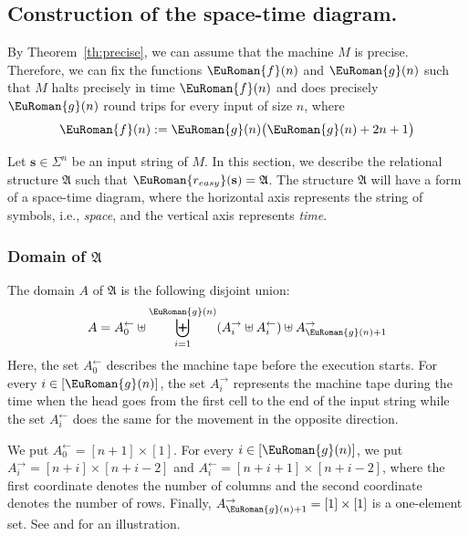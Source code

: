 \documentclass[10pt,a4paper]{amsart}
\theoremstyle{plain}
\theoremstyle{definition}
\numberwithin{equation}{section}
\newcommand{\eurm}[1]{\EuRoman{#1}} %
\newcommand{\ie}{i.e.\xspace}  %
\newcommand{\structure}[1]{\mathfrak{#1}} %
\newcommand{\tuple}[1]{\mathbf{#1}} %
\newcommand{\func}[1]{\eurm{#1}}  %
\begin{document}
\medskip




\subsection{Construction of the space-time diagram.}\label{subsection:space_time_diagram}

By Theorem~\ref{th:precise}, we can assume that the machine $M$ is precise. Therefore, we can fix the functions $\func{f}(n)$ and $\func{g}(n)$ such that $M$ halts precisely in time $\func{f}(n)$ and does precisely $\func{g}(n)$ round trips for every input of size $n$, where
\begin{equation*}
\func{f}(n) := \func{g}(n)\bigl(\func{g}(n)+2n+1\bigr)
\end{equation*} 


Let $\tuple{s}\in\Sigma^n$ be an input string of $M$. In this section, we describe the relational structure $\structure{A}$ such that $\func{r_{easy}}(\tuple{s}) = \structure{A}$. 
The structure $\structure{A}$ will have a form of a space-time diagram, where the horizontal axis represents the string of symbols, \ie, \emph{space}, and the vertical axis represents \emph{time}.

\subsubsection*{Domain of $\structure{A}$}
The domain $A$ of $\structure{A}$ is the following disjoint union:
\begin{equation}
A = A_0^\leftarrow\uplus \biguplus_{i=1}^{\func{g}(n)}(A_i^\rightarrow\uplus A_i^\leftarrow) \uplus A_{\func{g}(n)+1}^\rightarrow
\end{equation}
Here, the set $A_0^\leftarrow$ describes the machine tape before the execution starts.
For every $i\in[\func{g}(n)]$, the set $A_i^\rightarrow$ represents the machine tape during the time when the head goes from the first cell to the end of the input string while the set $A_i^\leftarrow$ does the same for the movement in the opposite direction.

We put $A_0^\leftarrow = [n+1]\times[1]$.
For every $i\in[\func{g}(n)]$, we put $A_i^\rightarrow = [n+i]\times[n+i-2]$ and $A_i^\leftarrow = [n+i+1]\times[n+i-2]$, where the first coordinate denotes the number of columns and the second coordinate denotes the number of rows.
Finally, $A_{\func{g}(n)+1}^\rightarrow = [1]\times[1]$ is a one-element set.
See  and  for an illustration.
\end{document}
